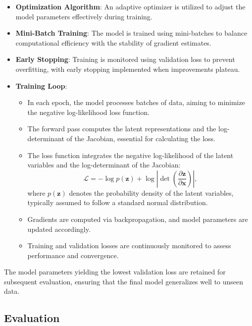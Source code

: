 \documentclass[11pt]{paper}
\begin{document}
\begin{itemize}
    \item \textbf{Optimization Algorithm}: An adaptive optimizer is utilized to adjust the model parameters effectively during training.
    \item \textbf{Mini-Batch Training}: The model is trained using mini-batches to balance computational efficiency with the stability of gradient estimates.
    \item \textbf{Early Stopping}: Training is monitored using validation loss to prevent overfitting, with early stopping implemented when improvements plateau.
    \item \textbf{Training Loop}:
    \begin{itemize}
        \item In each epoch, the model processes batches of data, aiming to minimize the negative log-likelihood loss function.
        \item The forward pass computes the latent representations and the log-determinant of the Jacobian, essential for calculating the loss.
        \item The loss function integrates the negative log-likelihood of the latent variables and the log-determinant of the Jacobian:
        \begin{equation}
        \mathcal{L} = -\log p(\mathbf{z}) + \log \left| \det \left( \frac{\partial \mathbf{z}}{\partial \mathbf{x}} \right) \right|,
        \label{eq:cinn_loss}
        \end{equation}
        where $p(\mathbf{z})$ denotes the probability density of the latent variables, typically assumed to follow a standard normal distribution.
        \item Gradients are computed via backpropagation, and model parameters are updated accordingly.
        \item Training and validation losses are continuously monitored to assess performance and convergence.
    \end{itemize}
\end{itemize}

The model parameters yielding the lowest validation loss are retained for subsequent evaluation, ensuring that the final model generalizes well to unseen data.

\subsection{Evaluation}
\end{document}
